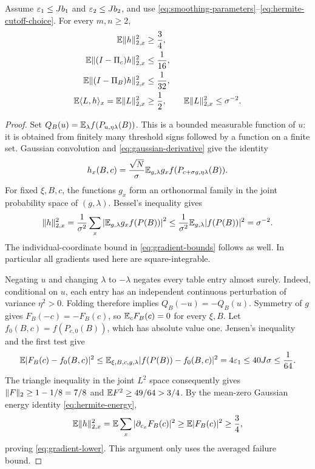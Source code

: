 \begin{lemma}\label{lem:smoothing-cutoffs}
Assume $\varepsilon_1\le Jb_1$ and $\varepsilon_2\le Jb_2$, and use
\eqref{eq:smoothing-parameters}--\eqref{eq:hermite-cutoff-choice}.
For every $m,n\ge2$,
\begin{align}
 \mathbb E\lVert h\rVert_{2,x}^2&\ge\frac34,\label{eq:gradient-lower}\\
 \mathbb E\lVert(I-\Pi_c)h\rVert_{2,x}^2&\le\frac1{16},\label{eq:c-tail}\\
 \mathbb E\lVert(I-\Pi_B)h\rVert_{2,x}^2&\le\frac1{32},\label{eq:B-tail}\\
 \mathbb E\langle L,h\rangle_x=\mathbb E\lVert L\rVert_{2,x}^2&\ge\frac12,
 \qquad \mathbb E\lVert L\rVert_{2,x}^2\le\sigma^{-2}.
 \label{eq:L-energy}
\end{align}
\end{lemma}
\begin{proof}
Set
$Q_B(u)=\mathbb E_\lambda f(P_{u,\eta\lambda}(B))$.
This is a bounded measurable function of $u$: it is obtained from finitely
many threshold signs followed by a function on a finite set. Gaussian
convolution and \eqref{eq:gaussian-derivative} give the identity
\begin{equation}\label{eq:h-convolution}
 h_x(B,c)=\frac{\sqrt N}{\sigma}
 \mathbb E_{g,\lambda}g_xf(P_{c+\sigma g,\eta\lambda}(B)).
\end{equation}
For fixed $\xi,B,c$, the functions $g_x$ form an orthonormal family in
the joint probability space of $(g,\lambda)$. Bessel's inequality gives
\[
 \lVert h\rVert_{2,x}^2
 =\frac1{\sigma^2}\sum_x
 \left|\mathbb E_{g,\lambda}g_xf(P(B))\right|^2
 \le\frac1{\sigma^2}\mathbb E_{g,\lambda}|f(P(B))|^2
 =\sigma^{-2}.
\]
The individual-coordinate bound in \eqref{eq:gradient-bounds} follows
as well. In particular all gradients used here are square-integrable.

Negating $u$ and changing $\lambda$ to $-\lambda$ negates every table
entry almost surely. Indeed, conditional on $u$, each entry has an
independent continuous perturbation of variance $\eta^2>0$. Folding
therefore implies $Q_B(-u)=-Q_B(u)$. Symmetry of $g$ gives
$F_B(-c)=-F_B(c)$, so $\mathbb E_c F_B(c)=0$ for every $\xi,B$.
Let $f_0(B,c)=f(P_{c,0}(B))$, which has absolute value one. Jensen's
inequality and the first test give
\[
 \mathbb E|F_B(c)-f_0(B,c)|^2
 \le\mathbb E_{\xi,B,c,g,\lambda}|f(P(B))-f_0(B,c)|^2
 =4\varepsilon_1\le40J\sigma\le\frac1{64}.
\]
The triangle inequality in the joint $L^2$ space consequently gives
$\lVert F\rVert_2\ge1-1/8=7/8$ and $\mathbb E F^2\ge49/64>3/4$.
By the mean-zero Gaussian energy identity \eqref{eq:hermite-energy},
\[
 \mathbb E\lVert h\rVert_{2,x}^2=\mathbb E\sum_x|\partial_{c_x}F_B(c)|^2
 \ge\mathbb E|F_B(c)|^2\ge\frac34,
\]
proving \eqref{eq:gradient-lower}. This argument only uses the averaged
failure bound.


\end{proof}
